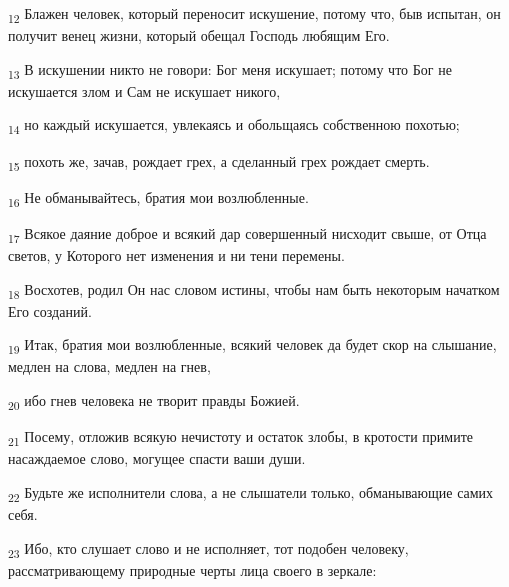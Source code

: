 \begin{tcolorbox}
\textsubscript{12} Блажен человек, который переносит искушение, потому что, быв испытан, он получит венец жизни, который обещал Господь любящим Его.
\end{tcolorbox}
\begin{tcolorbox}
\textsubscript{13} В искушении никто не говори: Бог меня искушает; потому что Бог не искушается злом и Сам не искушает никого,
\end{tcolorbox}
\begin{tcolorbox}
\textsubscript{14} но каждый искушается, увлекаясь и обольщаясь собственною похотью;
\end{tcolorbox}
\begin{tcolorbox}
\textsubscript{15} похоть же, зачав, рождает грех, а сделанный грех рождает смерть.
\end{tcolorbox}
\begin{tcolorbox}
\textsubscript{16} Не обманывайтесь, братия мои возлюбленные.
\end{tcolorbox}
\begin{tcolorbox}
\textsubscript{17} Всякое даяние доброе и всякий дар совершенный нисходит свыше, от Отца светов, у Которого нет изменения и ни тени перемены.
\end{tcolorbox}
\begin{tcolorbox}
\textsubscript{18} Восхотев, родил Он нас словом истины, чтобы нам быть некоторым начатком Его созданий.
\end{tcolorbox}
\begin{tcolorbox}
\textsubscript{19} Итак, братия мои возлюбленные, всякий человек да будет скор на слышание, медлен на слова, медлен на гнев,
\end{tcolorbox}
\begin{tcolorbox}
\textsubscript{20} ибо гнев человека не творит правды Божией.
\end{tcolorbox}
\begin{tcolorbox}
\textsubscript{21} Посему, отложив всякую нечистоту и остаток злобы, в кротости примите насаждаемое слово, могущее спасти ваши души.
\end{tcolorbox}
\begin{tcolorbox}
\textsubscript{22} Будьте же исполнители слова, а не слышатели только, обманывающие самих себя.
\end{tcolorbox}
\begin{tcolorbox}
\textsubscript{23} Ибо, кто слушает слово и не исполняет, тот подобен человеку, рассматривающему природные черты лица своего в зеркале:
\end{tcolorbox}
